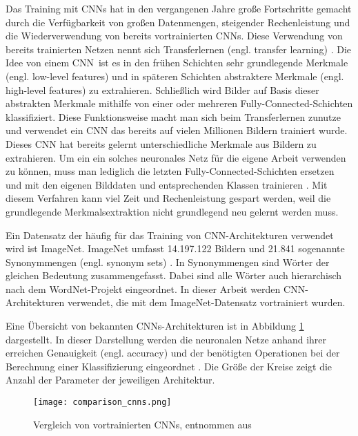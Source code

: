 Das Training mit \acp{CNN} hat in den vergangenen Jahre große Fortschritte gemacht durch die Verfügbarkeit von großen Datenmengen, steigender Rechenleistung und die Wiederverwendung von bereits vortrainierten \acp{CNN}. Diese Verwendung von bereits trainierten Netzen nennt sich Transferlernen (engl. transfer learning) \cite{oquab2014transfer}. Die Idee von einem \ac{CNN} ist es in den frühen Schichten sehr grundlegende Merkmale (engl. low-level features) und in späteren Schichten abstraktere Merkmale (engl. high-level features) zu extrahieren. Schließlich wird Bilder auf Basis dieser abstrakten Merkmale mithilfe von einer oder mehreren Fully-Connected-Schichten klassifiziert. Diese Funktionsweise macht man sich beim Transferlernen zunutze und verwendet ein \ac{CNN} das bereits auf vielen Millionen Bildern trainiert wurde. Dieses \ac{CNN} hat bereits gelernt unterschiedliche Merkmale aus Bildern zu extrahieren. Um ein ein solches neuronales Netz für die eigene Arbeit verwenden zu können, muss man lediglich die letzten Fully-Connected-Schichten ersetzen und mit den eigenen Bilddaten und entsprechenden Klassen trainieren \cite{oquab2014transfer}. Mit diesem Verfahren kann viel Zeit und Rechenleistung gespart werden, weil die grundlegende Merkmalsextraktion nicht grundlegend neu gelernt werden muss.

Ein Datensatz der häufig für das Training von \ac{CNN}-Architekturen verwendet wird ist ImageNet. ImageNet umfasst 14.197.122 Bildern und 21.841 sogenannte Synonymmengen (engl. synonym sets) \cite{deng2009imagenet}. In Synonymmengen sind Wörter der gleichen Bedeutung zusammengefasst. Dabei sind alle Wörter auch hierarchisch nach dem WordNet-Projekt eingeordnet. In dieser Arbeit werden \ac{CNN}-Architekturen verwendet, die mit dem ImageNet-Datensatz vortrainiert wurden.

Eine Übersicht von bekannten \acp{CNN}-Architekturen ist in Abbildung \ref{fig_comparison_cnns} dargestellt. In dieser Darstellung werden die neuronalen Netze anhand ihrer erreichen Genauigkeit (engl. accuracy) und der benötigten Operationen bei der Berechnung einer Klassifizierung eingeordnet \cite{canziani2016analysis}. Die Größe der Kreise zeigt die Anzahl der Parameter der jeweiligen Architektur. 

\begin{figure}[h]
\centering
\texttt{[image: comparison\_cnns.png]}
\caption{Vergleich von vortrainierten \aclp{CNN}, entnommen aus \cite{canziani2016analysis}}
\label{fig_comparison_cnns}
\end{figure}

